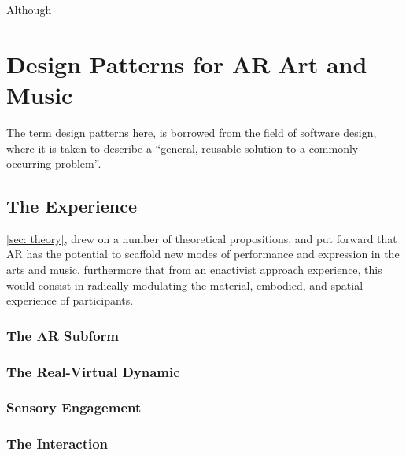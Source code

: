 Although 





\section{Design Patterns for AR Art and Music} \label{sec:  method-patterns} %

The term design patterns here, is borrowed from the field of software design, where it is taken to describe a ``general, reusable solution to a commonly occurring problem''. 

\subsection{The Experience}
\autoref{sec: theory}, drew on a number of theoretical propositions, and put forward that AR has the potential to scaffold new modes of performance and expression in the arts and music, furthermore that from an enactivist approach experience, this would consist in radically modulating the material, embodied, and spatial experience of participants.

\subsubsection{The AR Subform}
\subsubsection{The Real-Virtual Dynamic}
\subsubsection{Sensory Engagement}
\subsubsection{The Interaction}     %


